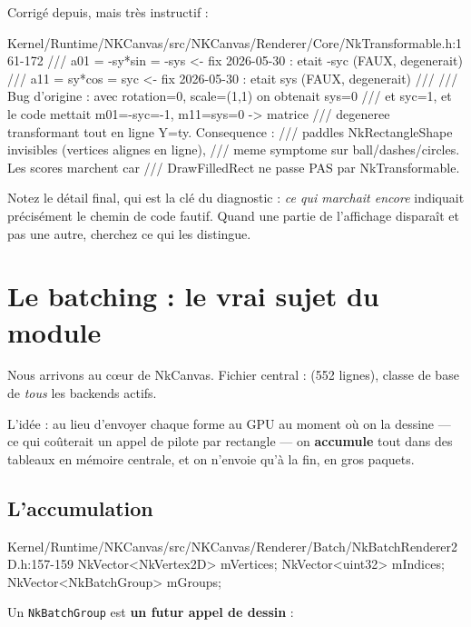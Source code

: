 \begin{nkpiege}
Corrigé depuis, mais très instructif :

\begin{nkcode}{Kernel/Runtime/NKCanvas/src/NKCanvas/Renderer/Core/NkTransformable.h:161-172}
/// a01 = -sy*sin = -sys     <- fix 2026-05-30 : etait -syc (FAUX, degenerait)
/// a11 = sy*cos = syc       <- fix 2026-05-30 : etait sys (FAUX, degenerait)
///
/// Bug d'origine : avec rotation=0, scale=(1,1) on obtenait sys=0
/// et syc=1, et le code mettait m01=-syc=-1, m11=sys=0 -> matrice
/// degeneree transformant tout en ligne Y=ty. Consequence :
/// paddles NkRectangleShape invisibles (vertices alignes en ligne),
/// meme symptome sur ball/dashes/circles. Les scores marchent car
/// DrawFilledRect ne passe PAS par NkTransformable.
\end{nkcode}

Notez le détail final, qui est la clé du diagnostic : \emph{ce qui marchait
encore} indiquait précisément le chemin de code fautif. Quand une partie de
l'affichage disparaît et pas une autre, cherchez ce qui les distingue.
\end{nkpiege}

\section{Le batching : le vrai sujet du module}

Nous arrivons au cœur de NkCanvas. Fichier central :
(552 lignes), classe de base de \emph{tous} les backends actifs.

L'idée : au lieu d'envoyer chaque forme au GPU au moment où on la dessine — ce
qui coûterait un appel de pilote par rectangle — on \textbf{accumule} tout dans
des tableaux en mémoire centrale, et on n'envoie qu'à la fin, en gros paquets.

\subsection{L'accumulation}

\begin{nkcode}{Kernel/Runtime/NKCanvas/src/NKCanvas/Renderer/Batch/NkBatchRenderer2D.h:157-159}
NkVector<NkVertex2D> mVertices;
NkVector<uint32>     mIndices;
NkVector<NkBatchGroup> mGroups;
\end{nkcode}

Un \texttt{NkBatchGroup} est \textbf{un futur appel de dessin} :

